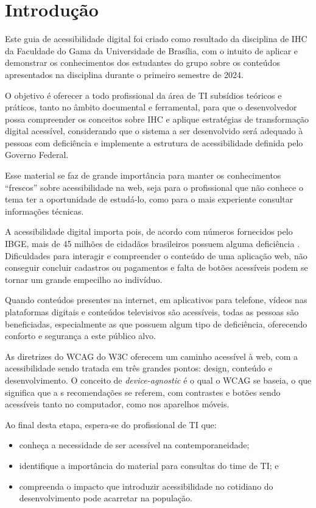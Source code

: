\documentclass[
  12pt,
  openright,
  twoside,
  a4paper,
  english,
  french,
  spanish,
  brazil
]{abntex2}
\begin{document}
\chapter{Introdução}

Este guia de acessibilidade digital foi criado como resultado da disciplina de
IHC da Faculdade do Gama da Universidade de Brasília, com o intuito de aplicar e
demonstrar os conhecimentos dos estudantes do grupo sobre os conteúdos
apresentados na disciplina durante o primeiro semestre de 2024.

O objetivo é oferecer a todo profissional da área de TI subsídios teóricos e
práticos, tanto no âmbito documental e ferramental, para que o desenvolvedor
possa compreender os conceitos sobre IHC e aplique estratégias de transformação
digital acessível, considerando que o sistema a ser desenvolvido será adequado à
pessoas com deficiência e implemente a estrutura de acessibilidade definida pelo
Governo Federal.

Esse material se faz de grande importância para manter os conhecimentos
``frescos'' sobre acessibilidade na web, seja para o profissional que não
conhece o tema ter a oportunidade de estudá-lo, como para o mais experiente
consultar informações técnicas.

A acessibilidade digital importa pois, de acordo com números fornecidos pelo
IBGE, mais de 45 milhões de cidadãos brasileiros possuem alguma deficiência
\cite{DAP:Guia-de-Boas-Praticas}. Dificuldades para interagir e compreender o
conteúdo de uma aplicação web, não conseguir concluir cadastros ou pagamentos e
falta de botões acessíveis podem se tornar um grande empecilho ao indivíduo.

Quando conteúdos presentes na internet, em aplicativos para telefone, vídeos nas
plataformas digitais e conteúdos televisivos são acessíveis, todas as pessoas
são beneficiadas, especialmente as que possuem algum tipo de deficiência,
oferecendo conforto e segurança a este público alvo.

As diretrizes do WCAG do W3C oferecem um caminho acessível à web, com a
acessibilidade sendo tratada em três grandes pontos: design, conteúdo e
desenvolvimento. O conceito de \textit{device-agnostic} é o qual o WCAG se
baseia, o que significa que a s recomendações se referem, com contrastes e
botões sendo acessíveis tanto no computador, como nos aparelhos móveis.

Ao final desta etapa, espera-se do profissional de TI que:

\begin{itemize}
  \item conheça a necessidade de ser acessível na contemporaneidade;
  \item identifique a importância do material para consultas do time de TI; e
  \item
    compreenda o impacto que introduzir acessibilidade no cotidiano do
    desenvolvimento pode acarretar na população.
\end{itemize}
\end{document}
